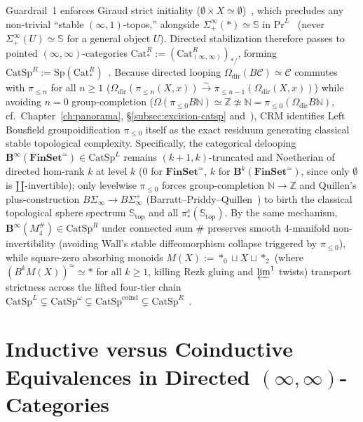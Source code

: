 Guardrail~1 enforces Giraud strict initiality ($\emptyset \times X \simeq \emptyset$)~\cite[Thm.~6.1.0.6, \S 6.1.1]{Lurie09}, which precludes any non-trivial ``stable $(\infty,1)$-topos,'' alongside $\Sigma^\infty_+(*) \simeq \mathbb{S}$ in $\mathrm{Pr}^L$~\cite[\S\S 1.4.4, 4.8.2]{Lurie17} (never $\Sigma^\infty_+(U) \simeq \mathbb{S}$ for a general object $U$). Directed stabilization therefore passes to pointed $(\infty,\infty)$-categories $\mathrm{Cat}^R_* := (\mathrm{Cat}^R_{(\infty,\infty)})_{*/}$, forming $\mathrm{CatSp}^R := \mathrm{Sp}(\mathrm{Cat}^R_*)$~\cite{Masuda26,Heine26}. Because directed looping $\Omega_{\mathrm{dir}}(B\mathcal{C}) \simeq \mathcal{C}$ commutes with $\pi_{\le n}$ for all $n \ge 1$ ($\Omega_{\mathrm{dir}}(\pi_{\le n}(X, x)) \xrightarrow{\sim} \pi_{\le n-1}(\Omega_{\mathrm{dir}}(X, x))$) while avoiding $n = 0$ group-completion ($\Omega(\pi_{\le 0} B\mathbb{N}) \simeq \mathbb{Z} \not\simeq \mathbb{N} = \pi_{\le 0}(\Omega_{\mathrm{dir}} B\mathbb{N})$, cf.\ Chapter~\ref{ch:panorama}, \S\ref{subsec:excision-catsp} and~\cite{Heine26,Geiss26}), $\mathrm{CRM}$ identifies Left Bousfield groupoidification $\pi_{\le 0}$ itself as the exact residuum generating classical stable topological complexity. Specifically, the categorical delooping $\mathbf{B}^\infty(\mathbf{FinSet}^{\simeq}) \in \mathrm{CatSp}^L$ remains $(k+1, k)$-truncated and Noetherian of directed hom-rank $k$ at level $k$ ($0$ for $\mathbf{FinSet}^{\simeq}$, $k$ for $\mathbf{B}^k(\mathbf{FinSet}^{\simeq})$, since only $\emptyset$ is $\amalg$-invertible); only levelwise $\pi_{\le 0}$ forces group-completion $\mathbb{N} \to \mathbb{Z}$ and Quillen's plus-construction $B\Sigma_\infty \to B\Sigma_\infty^+$ (Barratt--Priddy--Quillen~\cite{BarrattPriddy72,Quillen71}) to birth the classical topological sphere spectrum $\mathbb{S}_{\mathrm{top}}$ and all $\pi_*^s(\mathbb{S}_{\mathrm{top}})$. By the same mechanism, $\mathbf{B}^\infty(M_4^\#) \in \mathrm{CatSp}^R$ under connected sum $\#$ preserves smooth $4$-manifold non-invertibility (avoiding Wall's stable diffeomorphism collapse triggered by $\pi_{\le 0}$), while square-zero absorbing monoids $M(X) := *_0 \sqcup X \sqcup *_2$ (where $(B^k M(X))^{\simeq} \simeq *$ for all $k \ge 1$, killing Rezk gluing and $\varprojlim^1$ twists) transport strictness across the lifted four-tier chain $\mathrm{CatSp}^L \subsetneq \mathrm{CatSp}^\omega \subsetneq \mathrm{CatSp}^{\mathrm{coind}} \subsetneq \mathrm{CatSp}^R$~\cite{ORW26,GepnerHeine26}.

\section{Inductive versus Coinductive Equivalences in Directed $(\infty, \infty)$-Categories}\label{subsec:directed-inf-inf}

